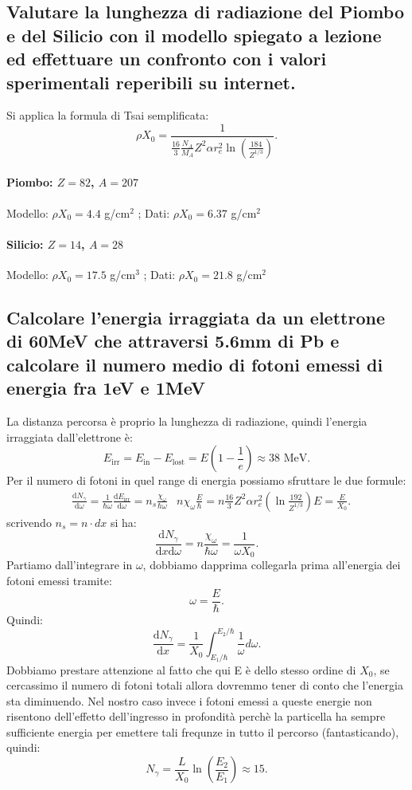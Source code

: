 \subsection[\hspace{1mm} Valutazione numerica della lunghezza di radiazione in alcuni casi]{Valutare la lunghezza di radiazione del Piombo e del Silicio con il modello spiegato a lezione ed effettuare un confronto con i valori sperimentali reperibili su internet.
}
\label{sec:4.b.10}
Si applica la formula di Tsai semplificata:
\[
	\rho X_0 = \frac{1}{\frac{16}{3} \frac{N_{A}}{M_A}Z^2\alpha r_e^2 \ln \left(\frac{184}{Z^{1 /3}}\right)}
.\] 
\paragraph{Piombo: $Z=82$, $A=207$} Modello: $\rho X_0= 4.4$ g/cm$^2$ ; Dati: $\rho X_0= 6.37$ g/cm$^2$ 
\paragraph{Silicio: $Z=14$, $A=28$} Modello: $\rho X_0=17.5$ g/cm$^3$ ; Dati: $\rho X_0= 21.8$ g/cm$^2$

\subsection[\hspace{1mm} Valutazione numerica dell'energia irraggiata da un elettrone nel piombo]{Calcolare l'energia irraggiata da un elettrone di 60MeV che attraversi 5.6mm di Pb e calcolare il numero medio di fotoni emessi di energia fra 1eV e 1MeV
}
\label{sec:4.b.11}
La distanza percorsa è proprio la lunghezza di radiazione, quindi l'energia irraggiata dall'elettrone è: 
\[
	E_{\text{irr}}= E_{\text{in}}-E_{\text{lost}}= E\left( 1-\frac{1}{e} \right) \approx 38 \text{ MeV}
.\] 
Per il numero di fotoni in quel range di energia possiamo sfruttare le due formule:
\begin{align*}
	&\frac{\mbox{d} N_{\gamma}}{\mbox{d} \omega} = \frac{1}{\hbar \omega}\frac{\mbox{d} E_{\text{irr}}}{\mbox{d} \omega} = n_s \frac{\chi_{\omega}}{\hbar \omega}
	&n \chi_{\omega}\frac{E}{\hbar} = n \frac{16}{3}Z^2\alpha r_e^2\left( \ln \frac{192}{Z^{1 /3}}  \right)E= \frac{E}{X_0}
.\end{align*}
scrivendo $n_s = n\cdot dx$ si ha:
 \[
	\frac{\mbox{d} N_{\gamma}}{\mbox{d}x \text{d}\omega}=n \frac{\chi_{\omega}}{\hbar \omega}=\frac{1}{\omega X_0} 
.\] 
Partiamo dall'integrare in $\omega$, dobbiamo dapprima collegarla prima all'energia dei fotoni emessi tramite:
\[
	\omega = \frac{E}{\hbar}
.\] 
Quindi:
\[
	\frac{\mbox{d} N_{\gamma}}{\mbox{d} x} = \frac{1}{X_0} \int_{E_1 /\hbar}^{E_2/\hbar} \frac{1}{\omega} d\omega   
.\] 
Dobbiamo prestare attenzione al fatto che qui E è dello stesso ordine di $X_0$, se cercassimo il numero di fotoni totali allora dovremmo tener di conto che l'energia sta diminuendo. Nel nostro caso invece i fotoni emessi a queste energie non risentono dell'effetto dell'ingresso in profondità perchè la particella ha sempre sufficiente energia per emettere tali frequnze in tutto il percorso (fantasticando), quindi:
\[
	N_{\gamma}= \frac{L}{X_0 } \ln\left( \frac{E_2}{E_1} \right) \approx 15
.\] 



